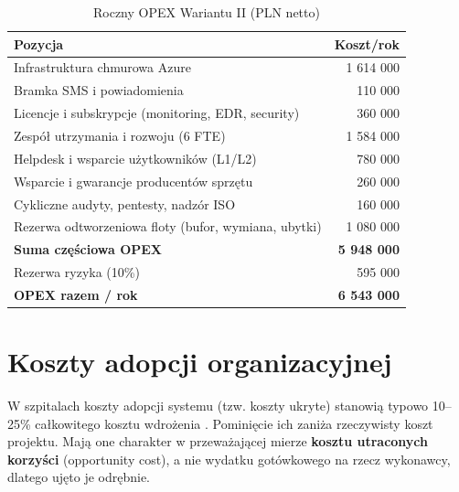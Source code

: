 \begin{table}[h]
\centering
\small
\renewcommand{\arraystretch}{1.2}
\begin{tabular}{|L{10.5cm}|r|}
\hline
{}\textbf{Pozycja} & \textbf{Koszt/rok} \\
\hline
Infrastruktura chmurowa Azure & 1 614 000 \\
\hline
Bramka SMS i powiadomienia & 110 000 \\
\hline
Licencje i subskrypcje (monitoring, EDR, security) & 360 000 \\
\hline
Zespół utrzymania i rozwoju (6 FTE) & 1 584 000 \\
\hline
Helpdesk i wsparcie użytkowników (L1/L2) & 780 000 \\
\hline
Wsparcie i gwarancje producentów sprzętu & 260 000 \\
\hline
Cykliczne audyty, pentesty, nadzór ISO & 160 000 \\
\hline
Rezerwa odtworzeniowa floty (bufor, wymiana, ubytki) & 1 080 000 \\
\hline
{}\textbf{Suma częściowa OPEX} & \textbf{5 948 000} \\
\hline
Rezerwa ryzyka (10\%) & 595 000 \\
\hline
{}\textbf{OPEX razem / rok} & \textbf{6 543 000} \\
\hline
\end{tabular}
\caption{Roczny OPEX Wariantu II (PLN netto)}
\label{tab:opex_suma}
\end{table}

\section{Koszty adopcji organizacyjnej}

W szpitalach koszty adopcji systemu (tzw. koszty ukryte) stanowią typowo 10--25\% całkowitego kosztu wdrożenia \cite{Deloitte_DigitalHealth_2024}. Pominięcie ich zaniża rzeczywisty koszt projektu. Mają one charakter w przeważającej mierze \textbf{kosztu utraconych korzyści} (opportunity cost), a nie wydatku gotówkowego na rzecz wykonawcy, dlatego ujęto je odrębnie.

